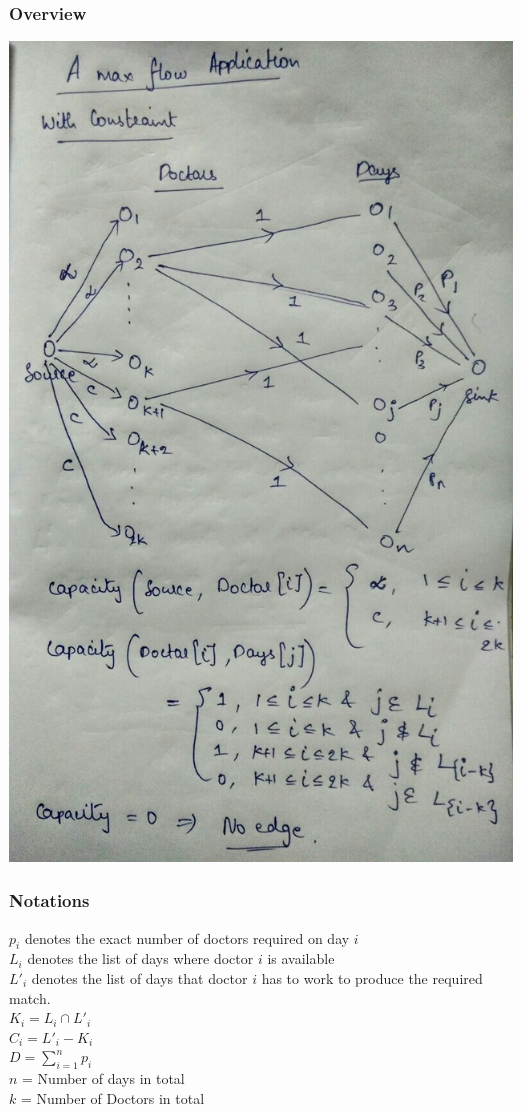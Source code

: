 \documentclass{article}
\begin{document}
\subsubsection{Overview}
\includegraphics[scale=0.5]{3b.jpg}
\newpage
\subsubsection{Notations}
$p_i$ denotes the exact number of doctors required on day $i$ \\
$L_i$ denotes the list of days where doctor $i$ is available \\
$L'_i$ denotes the list of days that doctor $i$ has to work to produce the required match. \\
$K_i = L_i \cap  L'_i$ \\
$C_i = L'_i - K_i$ \\ 
$D = \sum_{i=1}^{n} p_i$ \\
$n$ = Number of days in total \\
$k$ = Number of Doctors in total \\ 
\end{document}
